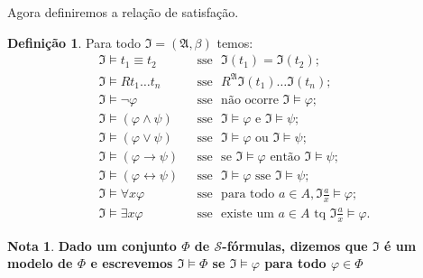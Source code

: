 \documentclass[11pt]{article}
\theoremstyle{definition}
\newtheorem{defn}{Definição}
\newtheorem{note}{Nota}
\newcommand{\sse}{\leftrightarrow}
\newcommand{\mc}[1]{\mathcal{#1}}
\newcommand{\mf}[1]{\mathfrak{#1}}
\begin{document}
Agora definiremos a relação de satisfação.

\begin{shaded}
\begin{defn}
Para todo $\mf{I}=(\mf{A},\beta)$ temos:
\begin{align*}
    \mf{I}\vDash t_1\equiv t_2 & ~~~\text{sse}~~~ \mf{I}(t_1)=\mf{I}(t_2);\\
    \mf{I}\vDash Rt_1\dots t_n & ~~~\text{sse}~~~ R^\mf{A}\mf{I}(t_1)\dots\mf{I}(t_n);\\
    \mf{I}\vDash\neg\varphi & ~~~\text{sse}~~~\text{não ocorre }\mf{I}\vDash\varphi;\\
    \mf{I}\vDash(\varphi\wedge\psi) & ~~~\text{sse}~~~ \mf{I}\vDash\varphi\text{ e }\mf{I}\vDash\psi;\\
    \mf{I}\vDash(\varphi\vee\psi) & ~~~\text{sse}~~~ \mf{I}\vDash\varphi\text{ ou }\mf{I}\vDash\psi;\\
    \mf{I}\vDash(\varphi\to\psi) & ~~~\text{sse}~~~ \text{se } \mf{I}\vDash\varphi\text{ então }\mf{I}\vDash\psi;\\
    \mf{I}\vDash(\varphi\sse\psi) & ~~~\text{sse}~~~ \mf{I}\vDash\varphi\text{ sse }\mf{I}\vDash\psi;\\
    \mf{I}\vDash\forall x\varphi & ~~~\text{sse}~~~\text{para todo }a\in A,\mf{I}\frac{a}{x}\vDash\varphi;\\
    \mf{I}\vDash\exists x\varphi & ~~~\text{sse}~~~\text{existe um }a\in A\text{ tq }\mf{I}\frac{a}{x}\vDash\varphi.
\end{align*}
\end{defn}
\end{shaded}

\begin{note}
\textbf{Dado um conjunto $\Phi$ de $\mc{S}$-fórmulas, dizemos que $\mf{I}$ é um modelo de $\Phi$ e escrevemos $\mf{I}\vDash\Phi$ se $\mf{I}\vDash\varphi$ para todo $\varphi\in\Phi$}
\end{note}
\end{document}
